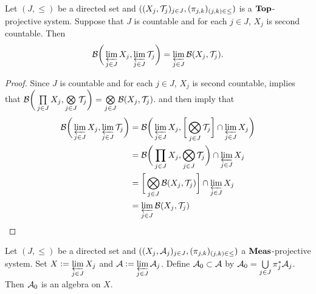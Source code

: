 \documentclass{book}
\begin{document}
\begin{ex} 
	Let $(J, \leq)$ be a directed set and $((X_j, \mathcal{T}_j)_{j \in J}, (\pi_{j,k})_{(j,k) \in \leq})$ is a $\operatorname*{\text{\textbf{Top}}}$-projective system. Suppose that $J$ is countable and for each $j \in J$, $X_j$ is second countable. Then 
	$$\mathcal{B}\bigg(\varprojlim\limits_{j \in J} X_j, \varprojlim\limits_{j \in J} \mathcal{T}_j  \bigg) = \varprojlim\limits_{j \in J} \mathcal{B}(X_j, \mathcal{T}_j).$$
\end{ex}

\begin{proof}
	Since $J$ is countable and for each $j \in J$, $X_j$ is second countable,  implies that $\mathcal{B}\bigg(\prod\limits_{j \in J} X_j, \bigotimes\limits_{j \in J} \mathcal{T}_j \bigg) = \bigotimes\limits_{j \in J} \mathcal{B}(X_j, \mathcal{T}_j)$.  and  then imply that
	\begin{align*}
		\mathcal{B} \bigg(\varprojlim\limits_{j \in J} X_j, \varprojlim\limits_{j \in J} \mathcal{T}_j \bigg)
		& = \mathcal{B} \bigg(\varprojlim\limits_{j \in J} X_j, \bigg[ \bigotimes\limits_{j \in J} \mathcal{T}_j \bigg] \cap \varprojlim\limits_{j \in J} X_j \bigg) \\
		& = \mathcal{B}\bigg( \prod\limits_{j \in J} X_j, \bigotimes\limits_{j \in J} \mathcal{T}_j  \bigg) \cap \varprojlim\limits_{j \in J} X_j \\
		& = \bigg[ \bigotimes\limits_{j \in J} \mathcal{B}(X_j, \mathcal{T}_j)  \bigg] \cap \varprojlim\limits_{j \in J} X_j \\
		& = \varprojlim\limits_{j \in J} \mathcal{B}(X_j, \mathcal{T}_j)
	\end{align*} 
\end{proof}

\begin{ex} 
	Let $(J, {\leq})$ be a directed set and $((X_j, \mathcal{A}_j)_{j \in J}, (\pi_{j,k})_{(j,k) \in \leq})$ a $\operatorname{\text{\textbf{Meas}}}$-projective system. Set $X \vcentcolon= \varprojlim\limits_{j \in J} X_j$ and $\mathcal{A} \vcentcolon= \varprojlim\limits_{j \in J} \mathcal{A}_j$. Define $\mathcal{A}_0 \subset \mathcal{A}$ by $\mathcal{A}_0 = \bigcup\limits_{j \in J} \pi_j^*\mathcal{A}_j$. Then $\mathcal{A}_0$ is an algebra on $X$. 
\end{ex}
\end{document}
